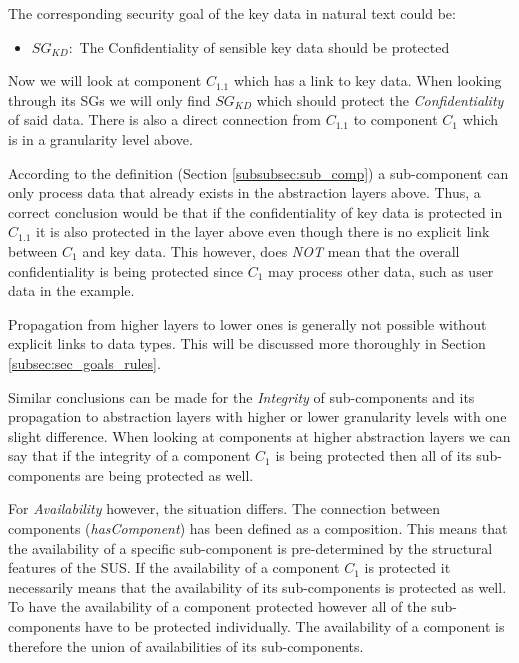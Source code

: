 The corresponding security goal of the key data in natural text could be:

\begin{itemize}
\item[]\textbf{$SG_{KD}:$} The Confidentiality of sensible key data should be protected
\end{itemize}

Now we will look at component $C_{1.1}$ which has a link to key data. When looking through its SGs we will only find $SG_{KD}$ which should protect the \textit{Confidentiality} of said data. There is also a direct connection from $C_{1.1}$ to component $C_1$ which is in a granularity level above. 

According to the definition (Section \ref{subsubsec:sub_comp}) a sub-component can only process data that already exists in the abstraction layers above. Thus, a correct conclusion would be that if the confidentiality of key data is protected in $C_{1.1}$ it is also protected in the layer above even though there is no explicit link between $C_1$ and key data. This however, does \textit{NOT} mean that the overall confidentiality is being protected since $C_1$ may process other data, such 
as user data in the example.

Propagation from higher layers to lower ones is generally not possible without explicit links to data types. This will be discussed more thoroughly in Section \ref{subsec:sec_goals_rules}.

Similar conclusions can be made for the \textit{Integrity} of sub-components and its propagation to abstraction layers with higher or lower granularity levels with one slight difference. When looking at components at higher abstraction layers we can say that if the integrity of a component $C_1$ is being protected then all of its sub-components are being protected as well. 

For \textit{Availability} however, the situation differs. The connection between components (\textit{hasComponent}) has been defined as a composition. This means that the availability of a specific sub-component is pre-determined by the structural features of the SUS. If the availability of a component $C_1$ is protected it necessarily means that the availability of its sub-components is protected as well. To have the availability of a component protected however all of the sub-components have to be protected individually. The availability of a component is therefore the union of availabilities of its sub-components.

